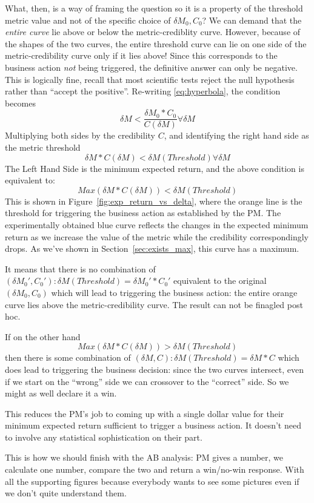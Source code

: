 \documentclass[letterpaper,12pt]{article}
\newcommand{\beq}{\begin{equation}} %
\newcommand{\eeq}{\end{equation}} %
\newcommand{\bdm}{\begin{displaymath}} %
\newcommand{\edm}{\end{displaymath}} %
\begin{document}
What, then, is a way of framing the question so it is a property of
the threshold metric value and not of the specific choice of \(\delta
M_0, C_0\)? We can demand that the {\em entire curve} lie above or
below the metric-crediblity curve. However, because of the shapes of
the two curves, the entire threshold curve can lie on one side of the
metric-credibility curve only if it lies above! Since this corresponds
to the business action {\em not} being triggered, the definitive
answer can only be negative. This is logically fine, recall that most
scientific tests reject the null hypothesis rather than ``accept the
positive''. Re-writing \ref{eq:hyperbola}, the condition becomes
\bdm
\delta M < \frac{\delta M_0 * C_0}{C(\delta M)} \forall \delta M
\edm
Multiplying both sides by the credibility \(C\), and identifying the
right hand side as the metric threshold
\beq
\delta M * C(\delta M) < \delta M(Threshold) \forall \delta M
\eeq
The Left Hand Side is the
minimum expected return, and the above condition is equivalent to:
\bdm
Max(\delta M*C(\delta M)) < \delta M(Threshold)
\edm
This is
shown in Figure~\ref{fig:exp_return_vs_delta}, where the orange line
is the threshold for triggering the business action as established by
the PM. The experimentally obtained blue curve reflects the changes in
the expected minimum return as we increase the value of the metric
while the credibility correspondingly drops. As we've shown in
Section~\ref{sec:exists_max}, this curve has a maximum.

It means that there is no combination of \((\delta M_0', C_0'): \delta
M(Threshold) = \delta M_0'*C_0'\) equivalent to the original \((\delta
M_0, C_0)\) which will lead to triggering the business action: the
entire orange curve lies above the metric-credibility curve. The
result can not be finagled post hoc.

If on the other hand
\bdm
Max(\delta M*C(\delta M)) > \delta M(Threshold)
\edm
then there is some combination of \((\delta M, C): \delta M(Threshold)
= \delta M*C\) which does lead to triggering the business decision:
since the two curves intersect, even if we start on the ``wrong'' side
we can crossover to the ``correct'' side. So we might as well declare
it a win.

This reduces the PM's job to coming up with a single dollar value for
their minimum expected return sufficient to trigger a business
action. It doesn't need to involve any statistical sophistication on
their part.

This is how we should finish with the AB analysis: PM gives a number,
we calculate one number, compare the two and return a win/no-win
response. With all the supporting figures because everybody wants to
see some pictures even if we don't quite understand them.
\end{document}
